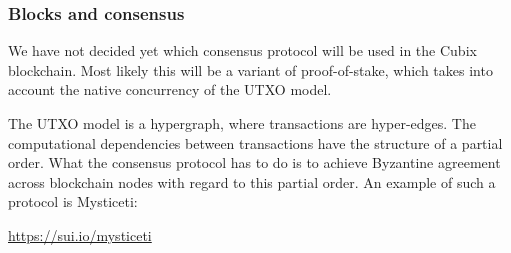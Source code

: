 \documentclass[a4paper]{article}
\begin{document}
\subsubsection{Blocks and consensus}

We have not decided yet which consensus protocol will be used in the Cubix blockchain. Most likely this will be a variant of proof-of-stake, which takes into account the native concurrency of the UTXO model.

The UTXO model is a hypergraph, where transactions are hyper-edges. The computational dependencies between transactions have the structure of a partial order. What the consensus protocol has to do is to achieve Byzantine agreement across blockchain nodes with regard to this partial order. An example of such a protocol is Mysticeti:

\href{https://sui.io/mysticeti}{https://sui.io/mysticeti}

\newpage

\begin{appendices}

\makeatletter
\renewcommand{\@seccntformat}[1]{%
  \@ifundefined{#1name}{}{\csname #1name\endcsname~}%
  \csname the#1\endcsname: }
\makeatother



\newpage



\newpage



\end{appendices}
\end{document}
